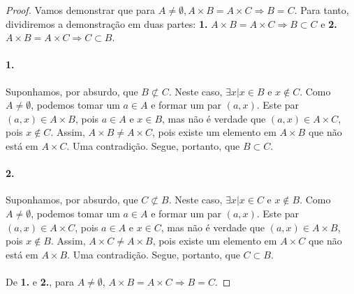 \documentclass[11pt,a4paper]{report}
\begin{document}
    \begin{proof}
    Vamos demonstrar que para $A \not= \emptyset, A \times B = A \times C \Rightarrow B = C$. Para tanto, dividiremos a demonstração em duas partes: \textbf{1.} $A \times B = A \times C \Rightarrow B \subset C$ e \textbf{2.} $A \times B = A \times C \Rightarrow C \subset B$.

    \paragraph{1.}
    Suponhamos, por absurdo, que $B \not\subset C$. Neste caso, $\exists x | x \in B$ e $x \not\in C$. Como $A \not= \emptyset$, podemos tomar um $a \in A$ e formar um par $(a, x)$. Este par $(a, x) \in A \times B$, pois $a \in A$ e $x \in B$, mas não é verdade que $(a, x) \in A \times C$, pois $x \not\in C$. Assim, $A \times B \not= A \times C$, pois existe um elemento em $A \times B$ que não está em $A \times C$. Uma contradição. Segue, portanto, que $B \subset C$.

    \paragraph{2.}
    Suponhamos, por absurdo, que $C \not\subset B$. Neste caso, $\exists x | x \in C$ e $x \not\in B$. Como $A \not= \emptyset$, podemos tomar um $a \in A$ e formar um par $(a, x)$. Este par $(a, x) \in A \times C$, pois $a \in A$ e $x \in C$, mas não é verdade que $(a, x) \in A \times B$, pois $x \not\in B$. Assim, $A \times C \not= A \times B$, pois existe um elemento em $A \times C$ que não está em $A \times B$. Uma contradição. Segue, portanto, que $C \subset B$.

    \paragraph{}
    De \textbf{1.} e \textbf{2.}, para $A \not= \emptyset$, $A \times B = A \times C \Rightarrow B = C$.
    \end{proof}
\end{document}
